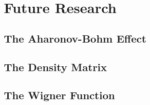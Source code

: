 \section{Future Research}
\label{sec:future}

\subsection{The Aharonov-Bohm Effect}

\subsection{The Density Matrix}

\subsection{The Wigner Function}
